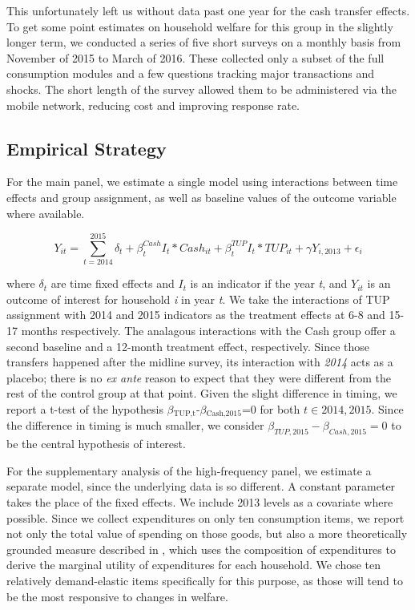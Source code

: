 \documentclass[12pt,article]{article}
\begin{document}
This unfortunately left us without data past one year for the cash transfer effects.
To get some point estimates on household welfare for this group in the slightly
longer term, we conducted a series of five short surveys on a monthly basis from
November of 2015 to March of 2016. These collected only a subset of the full
consumption modules and a few questions tracking major transactions and shocks. The
short length of the survey allowed them to be administered via the mobile network,
reducing cost and improving response rate.

\subsection{Empirical Strategy}
\label{sec-2-2}

For the main panel, we estimate a single model using interactions between time effects and group
assignment, as well as baseline values of the outcome variable where available. 

\begin{equation*}
Y_{it} =\sum_{t=2014}^{2015}\delta_{t}+\beta_{t}^{Cash}I_{t}*Cash_{it}+\beta_{t}^{TUP}I_{t}*TUP_{it}+\gamma Y_{i,2013}+\epsilon_{i}
\end{equation*}

where $\delta_{t}$ are time fixed effects and $I_{t}$ is an indicator if the year
\emph{t}, and $Y_{it}$ is an outcome of interest for household \emph{i} in year \emph{t}. We take
the interactions of TUP assignment with 2014 and 2015 indicators as the treatment
effects at 6-8 and 15-17 months respectively. The analagous interactions with the
Cash group offer a second baseline and a 12-month treatment effect, respectively.
Since those transfers happened after the midline survey, its interaction with \emph{2014}
acts as a placebo; there is no \emph{ex ante} reason to expect that they were different
from the rest of the control group at that point. Given the slight difference in
timing, we report a t-test of the hypothesis $\beta$$_{\text{TUP,t}}$-$\beta$$_{\text{Cash,2015}}$=0 for
both \(t \in {2014,2015}\). Since the difference in timing is much smaller, we consider
\(\beta_{TUP,2015}-\beta_{Cash,2015}=0\) to be the central hypothesis of interest.

For the supplementary analysis of the high-frequency panel, we estimate a separate
model, since the underlying data is so different. A constant parameter takes the
place of the fixed effects. We include 2013 levels as a covariate where possible.
Since we collect expenditures on only ten consumption items, we report not only the
total value of spending on those goods, but also a more theoretically grounded
measure described in \cite{collins-ligon17}, which uses the composition of
expenditures to derive the marginal utility of expenditures for each household. We
chose ten relatively demand-elastic items specifically for this purpose, as those
will tend to be the most responsive to changes in welfare.
\end{document}
